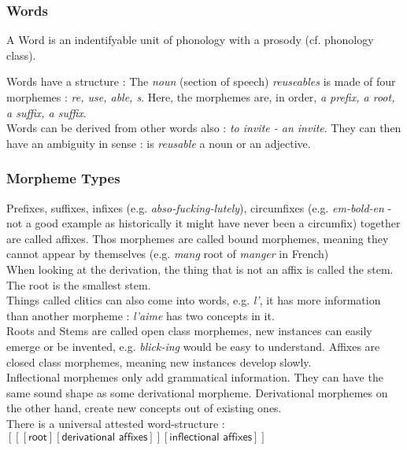 \documentclass{cours}
\begin{document}
\subsubsection{Words}
A Word is an indentifyable unit of phonology with a prosody (cf. phonology class).

Words have a structure\! : The \emph{noun} (section of speech) \textsl{reuseables} is made of four morphemes\! : \textsl{re, use, able, s}. Here, the morphemes are, in order, \textsl{a prefix, a root, a suffix, a suffix}. \\
Words can be derived from other words also\! : \textsl{to invite - an invite}. They can then have an ambiguity in sense\! : is \textsl{reusable} a noun or an adjective.\\

\subsubsection{Morpheme Types}
Prefixes, suffixes, infixes (e.g. \textsl{abso-\emph{fucking}-lutely}), circumfixes (e.g. \textsl{\emph{em}-bold-\emph{en}} - not a good example as historically it might have never been a circumfix) together are called affixes. Thos morphemes are called bound morphemes, meaning they cannot appear by themselves (e.g. \textsl{mang} root of \textit{manger} in French)\\
When looking at the derivation, the thing that is not an affix is called the stem. The root is the smallest stem. \\
Things called clitics can also come into words, e.g. \textsl{l'}, it has more information than another morpheme\! : \textsl{l'aime} has two concepts in it.\\
Roots and Stems are called open class morphemes, new instances can easily emerge or be invented, e.g. \textsl{blick-ing} would be easy to understand. Affixes are closed class morphemes, meaning new instances develop slowly.\\

Inflectional morphemes only add grammatical information. They can have the same sound shape as some derivational morpheme. Derivational morphemes on the other hand, create new concepts out of existing ones.\\

There is a universal attested word-structure\! : $\left[\left[\left[\textsf{root}\right]\left[\textsf{derivational affixes}\right]\right]\left[\textsf{inflectional affixes}\right]\right]$
\end{document}
